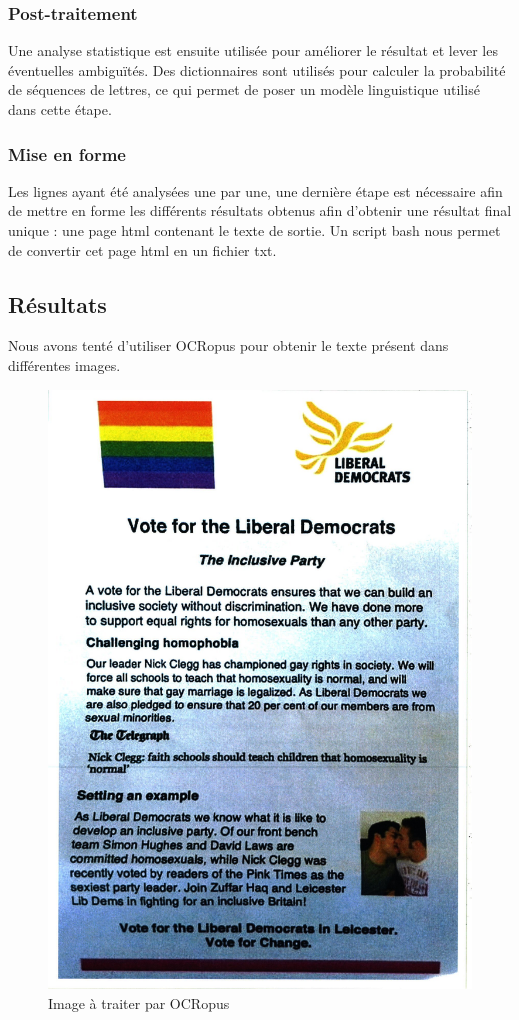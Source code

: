 	\subsubsection{Post-traitement}
		Une analyse statistique est ensuite utilisée pour améliorer le résultat et lever les éventuelles ambiguïtés. Des dictionnaires sont utilisés pour calculer la probabilité de séquences de lettres, ce qui permet de poser un modèle linguistique utilisé dans cette étape.

	\subsubsection{Mise en forme}
		Les lignes ayant été analysées une par une, une dernière étape est nécessaire afin de mettre en forme les différents résultats obtenus afin d'obtenir une résultat final unique : une page html contenant le texte de sortie. Un script bash nous permet de convertir cet page html en un fichier txt. 


\subsection{Résultats}
	
	Nous avons tenté d'utiliser OCRopus pour obtenir le texte présent dans différentes images. 

	\begin{figure}[H]
		\centering
		\includegraphics[scale=0.5]{images/FJEZNU.jpg}
		\caption{Image à traiter par OCRopus}
		\label{fig:image}
	\end{figure}

